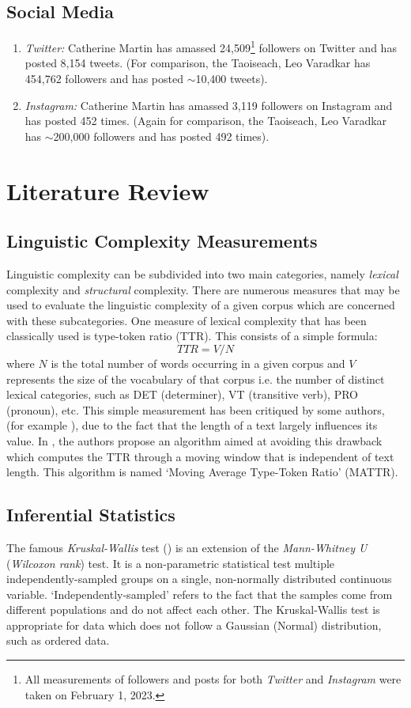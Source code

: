 \documentclass[a4paper,11pt]{article}
\begin{document}
\subsection{Social Media}
\begin{enumerate}
\item \textit{Twitter:} Catherine Martin has amassed 24,509\footnote{All measurements of followers and posts for both \textit{Twitter} and \textit{Instagram} were taken on February 1, 2023.} followers on Twitter and has posted 8,154 tweets. (For comparison, the Taoiseach, Leo Varadkar has 454,762 followers and has posted $\sim$10,400 tweets).
\item \textit{Instagram:} Catherine Martin has amassed 3,119 followers on Instagram and has posted 452 times. (Again for comparison, the Taoiseach, Leo Varadkar has $\sim$200,000 followers and has posted 492 times).
\end{enumerate}

\section{Literature Review}
\subsection{Linguistic Complexity Measurements}
Linguistic complexity can be subdivided into two main categories, namely \textit{lexical} complexity and \textit{structural} complexity. There are numerous measures that may be used to evaluate the linguistic complexity of a given corpus which are concerned with these subcategories. One measure of lexical complexity that has been classically used is type-token ratio (TTR). This consists of a simple formula:
\[
    TTR = V/N
\]
where $N$ is the total number of words occurring in a given corpus and $V$ represents the size of the vocabulary of that corpus i.e. the number of distinct lexical categories, such as DET (determiner), VT (transitive verb), PRO (pronoun), etc. This simple measurement has been critiqued by some authors, (for example \cite{mattr}), due to the fact that the length of a text largely influences its value. In \cite{mattr}, the authors propose an algorithm aimed at avoiding this drawback which computes the TTR through a moving window that is independent of text length. This algorithm is named `Moving Average Type-Token Ratio' (MATTR).

\subsection{Inferential Statistics}
The famous \textit{Kruskal-Wallis} test (\cite{kruskal-wallis}) is an extension of the \textit{Mann-Whitney U} (\textit{Wilcoxon rank}) test. It is a non-parametric statistical test multiple independently-sampled groups on a single, non-normally distributed continuous variable. `Independently-sampled' refers to the fact that the samples come from different populations and do not affect each other. The Kruskal-Wallis test is appropriate for data which does not follow a Gaussian (Normal) distribution, such as ordered data.
\end{document}
